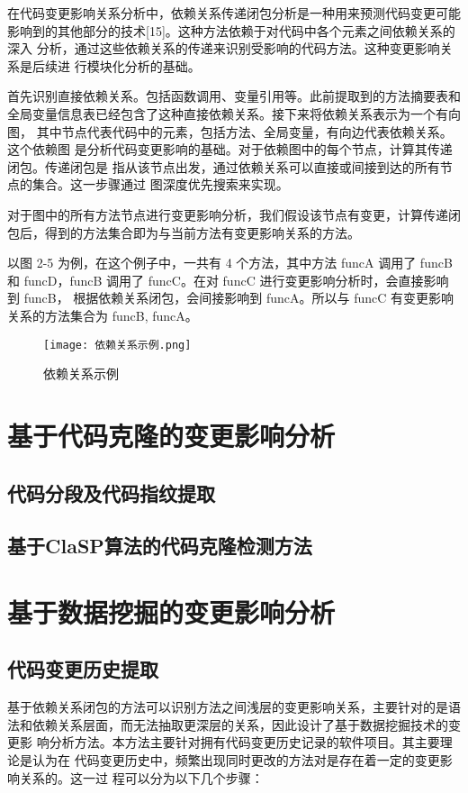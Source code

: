 在代码变更影响关系分析中，依赖关系传递闭包分析是一种用来预测代码变更可能
影响到的其他部分的技术[15]。这种方法依赖于对代码中各个元素之间依赖关系的深入
分析，通过这些依赖关系的传递来识别受影响的代码方法。这种变更影响关系是后续进
行模块化分析的基础。

首先识别直接依赖关系。包括函数调用、变量引用等。此前提取到的方法摘要表和
全局变量信息表已经包含了这种直接依赖关系。接下来将依赖关系表示为一个有向图，
其中节点代表代码中的元素，包括方法、全局变量，有向边代表依赖关系。这个依赖图
是分析代码变更影响的基础。对于依赖图中的每个节点，计算其传递闭包。传递闭包是
指从该节点出发，通过依赖关系可以直接或间接到达的所有节点的集合。这一步骤通过
图深度优先搜索来实现。

对于图中的所有方法节点进行变更影响分析，我们假设该节点有变更，计算传递闭
包后，得到的方法集合即为与当前方法有变更影响关系的方法。

以图 2-5 为例，在这个例子中，一共有 4 个方法，其中方法 funcA 调用了 funcB 和
funcD，funcB 调用了 funcC。在对 funcC 进行变更影响分析时，会直接影响到 funcB，
根据依赖关系闭包，会间接影响到 funcA。所以与 funcC 有变更影响关系的方法集合为
{funcB, funcA}。

\begin{figure}[h]
\centering
\texttt{[image: 依赖关系示例.png]}
\caption{依赖关系示例}
\end{figure}

\section{基于代码克隆的变更影响分析}
\subsection{代码分段及代码指纹提取}
\subsection{基于ClaSP算法的代码克隆检测方法}

\section{基于数据挖掘的变更影响分析}
\subsection{代码变更历史提取}
基于依赖关系闭包的方法可以识别方法之间浅层的变更影响关系，主要针对的是语
法和依赖关系层面，而无法抽取更深层的关系，因此设计了基于数据挖掘技术的变更影
响分析方法。本方法主要针对拥有代码变更历史记录的软件项目。其主要理论是认为在
代码变更历史中，频繁出现同时更改的方法对是存在着一定的变更影响关系的。这一过
程可以分为以下几个步骤：

